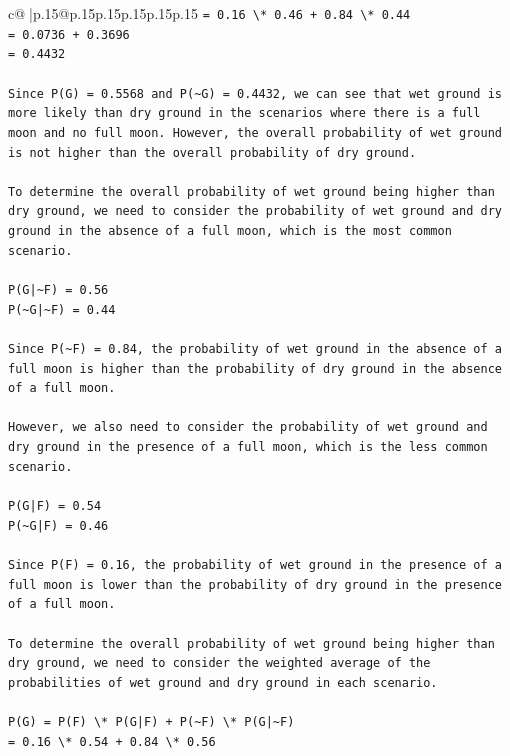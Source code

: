\documentclass{article}
\begin{document}
{\begin{supertabular}{c@{$\;$}|p{.15\linewidth}@{}p{.15\linewidth}p{.15\linewidth}p{.15\linewidth}p{.15\linewidth}p{.15\linewidth}}
{{{\texttt{= 0.16 \textbackslash{}* 0.46 + 0.84 \textbackslash{}* 0.44} \\
\texttt{= 0.0736 + 0.3696} \\
\texttt{= 0.4432} \\
\\ 
\texttt{Since P(G) = 0.5568 and P(\textasciitilde{}G) = 0.4432, we can see that wet ground is more likely than dry ground in the scenarios where there is a full moon and no full moon. However, the overall probability of wet ground is not higher than the overall probability of dry ground.} \\
\\ 
\texttt{To determine the overall probability of wet ground being higher than dry ground, we need to consider the probability of wet ground and dry ground in the absence of a full moon, which is the most common scenario.} \\
\\ 
\texttt{P(G|\textasciitilde{}F) = 0.56} \\
\texttt{P(\textasciitilde{}G|\textasciitilde{}F) = 0.44} \\
\\ 
\texttt{Since P(\textasciitilde{}F) = 0.84, the probability of wet ground in the absence of a full moon is higher than the probability of dry ground in the absence of a full moon.} \\
\\ 
\texttt{However, we also need to consider the probability of wet ground and dry ground in the presence of a full moon, which is the less common scenario.} \\
\\ 
\texttt{P(G|F) = 0.54} \\
\texttt{P(\textasciitilde{}G|F) = 0.46} \\
\\ 
\texttt{Since P(F) = 0.16, the probability of wet ground in the presence of a full moon is lower than the probability of dry ground in the presence of a full moon.} \\
\\ 
\texttt{To determine the overall probability of wet ground being higher than dry ground, we need to consider the weighted average of the probabilities of wet ground and dry ground in each scenario.} \\
\\ 
\texttt{P(G) = P(F) \textbackslash{}* P(G|F) + P(\textasciitilde{}F) \textbackslash{}* P(G|\textasciitilde{}F)} \\
\texttt{= 0.16 \textbackslash{}* 0.54 + 0.84 \textbackslash{}* 0.56} \\
}}}
\end{supertabular}}
\end{document}
